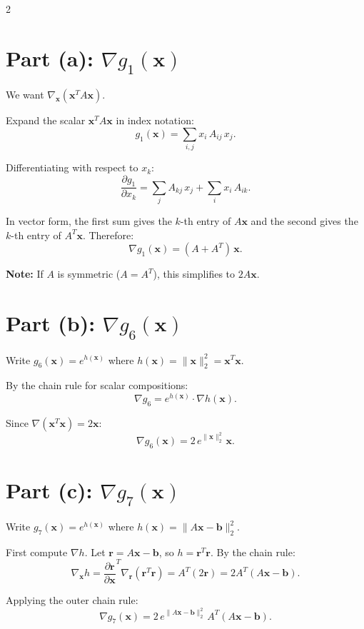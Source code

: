 \documentclass[9pt]{article}
\begin{document}
\begin{multicols}{2}

\section*{Part (a): $\nabla g_1(\mathbf{x})$}

We want $\nabla_{\mathbf{x}}(\mathbf{x}^T A \mathbf{x})$.

Expand the scalar $\mathbf{x}^T A \mathbf{x}$ in index notation:
\[
  g_1(\mathbf{x}) = \sum_{i,j} x_i \, A_{ij} \, x_j.
\]

Differentiating with respect to $x_k$:
\[
  \frac{\partial g_1}{\partial x_k}
  = \sum_j A_{kj}\, x_j + \sum_i x_i\, A_{ik}.
\]

In vector form, the first sum gives the $k$-th entry of $A\mathbf{x}$ and the second gives the $k$-th entry of $A^T \mathbf{x}$. Therefore:
\[
  \boxed{\nabla g_1(\mathbf{x}) = (A + A^T)\,\mathbf{x}.}
\]

\textbf{Note:} If $A$ is symmetric ($A = A^T$), this simplifies to $2A\mathbf{x}$.

\columnbreak

\section*{Part (b): $\nabla g_6(\mathbf{x})$}

Write $g_6(\mathbf{x}) = e^{h(\mathbf{x})}$ where $h(\mathbf{x}) = \|\mathbf{x}\|_2^2 = \mathbf{x}^T \mathbf{x}$.

By the chain rule for scalar compositions:
\[
  \nabla g_6 = e^{h(\mathbf{x})} \cdot \nabla h(\mathbf{x}).
\]

Since $\nabla(\mathbf{x}^T \mathbf{x}) = 2\mathbf{x}$:
\[
  \boxed{\nabla g_6(\mathbf{x}) = 2\,e^{\|\mathbf{x}\|_2^2}\,\mathbf{x}.}
\]

\vspace{8pt}

\section*{Part (c): $\nabla g_7(\mathbf{x})$}

Write $g_7(\mathbf{x}) = e^{h(\mathbf{x})}$ where $h(\mathbf{x}) = \|A\mathbf{x} - \mathbf{b}\|_2^2$.

First compute $\nabla h$. Let $\mathbf{r} = A\mathbf{x} - \mathbf{b}$, so $h = \mathbf{r}^T \mathbf{r}$. By the chain rule:
\[
  \nabla_{\mathbf{x}} h
  = \frac{\partial \mathbf{r}}{\partial \mathbf{x}}^T \nabla_{\mathbf{r}}(\mathbf{r}^T\mathbf{r})
  = A^T (2\mathbf{r})
  = 2A^T(A\mathbf{x} - \mathbf{b}).
\]

Applying the outer chain rule:
\[
  \boxed{\nabla g_7(\mathbf{x}) = 2\,e^{\|A\mathbf{x}-\mathbf{b}\|_2^2}\,A^T(A\mathbf{x}-\mathbf{b}).}
\]

\end{multicols}
\end{document}
